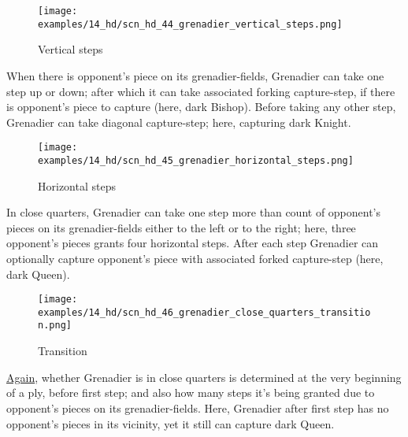\vspace*{-0.7\baselineskip}
\noindent
\begin{wrapfigure}[10]{l}{0.4\textwidth}
\centering
\texttt{[image: examples/14\_hd/scn\_hd\_44\_grenadier\_vertical\_steps.png]}
\vspace*{-0.5\baselineskip}
\caption{Vertical steps}
\label{fig:scn_hd_44_grenadier_vertical_steps}
\end{wrapfigure}
When there is opponent's piece on its grenadier-fields, Grenadier can take one step
up or down; after which it can take associated forking capture-step, if there is
opponent's piece to capture (here, dark Bishop). Before taking any other step,
Grenadier can take diagonal capture-step; here, capturing dark Knight.

\vspace*{-0.7\baselineskip}
\noindent
\begin{figure}[!h]
\texttt{[image: examples/14\_hd/scn\_hd\_45\_grenadier\_horizontal\_steps.png]}
\vspace*{-1.4\baselineskip}
\caption{Horizontal steps}
\label{fig:scn_hd_45_grenadier_horizontal_steps}
\end{figure}

\vspace*{-0.7\baselineskip}
In close quarters, Grenadier can take one step more than count of opponent's pieces
on its grenadier-fields either to the left or to the right; here, three opponent's
pieces grants four horizontal steps. After each step Grenadier can optionally capture
opponent's piece with associated forked capture-step (here, dark Queen).

\vspace*{-0.7\baselineskip}
\noindent
\begin{wrapfigure}[6]{l}{0.4\textwidth}
\centering
\texttt{[image: examples/14\_hd/scn\_hd\_46\_grenadier\_close\_quarters\_transition.png]}
\vspace*{-0.5\baselineskip}
\caption{Transition}
\label{fig:scn_hd_46_grenadier_close_quarters_transition}
\end{wrapfigure}
\hyperref[fig:scn_hd_42_grenadier_movement_transition]{Again},
whether Grenadier is in close quarters is determined at the very beginning of a ply,
before first step; and also how many steps it's being granted due to opponent's pieces
on its grenadier-fields.\newline
Here, Grenadier after first step has no opponent's pieces in its vicinity, yet it
still can capture dark Queen.

